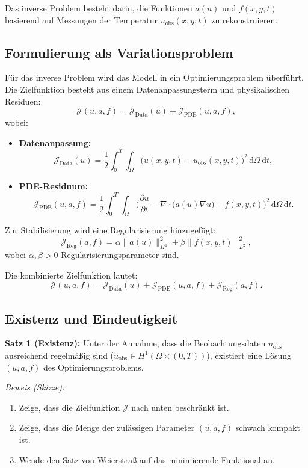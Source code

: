 Das inverse Problem besteht darin, die Funktionen \(a(u)\) und \(f(x, y, t)\) basierend auf Messungen der Temperatur \(u_\text{obs}(x, y, t)\) zu rekonstruieren.

\subsection{Formulierung als Variationsproblem}

Für das inverse Problem wird das Modell in ein Optimierungsproblem überführt. Die Zielfunktion besteht aus einem Datenanpassungsterm und physikalischen Residuen:
\[
\mathcal{J}(u, a, f) = \mathcal{J}_\text{Data}(u) + \mathcal{J}_\text{PDE}(u, a, f),
\]
wobei:
\begin{itemize}
	\item \textbf{Datenanpassung:}
	\[
	\mathcal{J}_\text{Data}(u) = \frac{1}{2} \int_0^T \int_\Omega \big(u(x, y, t) - u_\text{obs}(x, y, t)\big)^2 \, \mathrm{d}\Omega \, \mathrm{d}t,
	\]
	\item \textbf{PDE-Residuum:}
	\[
	\mathcal{J}_\text{PDE}(u, a, f) = \frac{1}{2} \int_0^T \int_\Omega \bigg(\frac{\partial u}{\partial t} - \nabla \cdot \big(a(u) \nabla u\big) - f(x, y, t)\bigg)^2 \, \mathrm{d}\Omega \, \mathrm{d}t.
	\]
\end{itemize}

Zur Stabilisierung wird eine Regularisierung hinzugefügt:
\[
\mathcal{J}_\text{Reg}(a, f) = \alpha \|a(u)\|_{H^1}^2 + \beta \|f(x, y, t)\|_{L^2}^2,
\]
wobei \(\alpha, \beta > 0\) Regularisierungsparameter sind.

Die kombinierte Zielfunktion lautet:
\[
\mathcal{J}(u, a, f) = \mathcal{J}_\text{Data}(u) + \mathcal{J}_\text{PDE}(u, a, f) + \mathcal{J}_\text{Reg}(a, f).
\]

\subsection{Existenz und Eindeutigkeit}

\textbf{Satz 1 (Existenz):}  
Unter der Annahme, dass die Beobachtungsdaten \(u_\text{obs}\) ausreichend regelmäßig sind (\(u_\text{obs} \in H^1(\Omega \times (0, T))\)), existiert eine Lösung \((u, a, f)\) des Optimierungsproblems.

\textit{Beweis (Skizze):}
\begin{enumerate}
	\item Zeige, dass die Zielfunktion \(\mathcal{J}\) nach unten beschränkt ist.
	\item Zeige, dass die Menge der zulässigen Parameter \((u, a, f)\) schwach kompakt ist.
	\item Wende den Satz von Weierstraß auf das minimierende Funktional an.
\end{enumerate}

